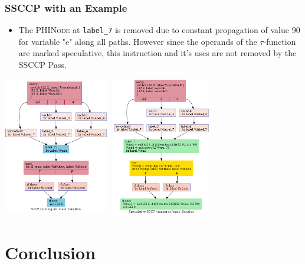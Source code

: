 \documentclass{beamer}
\begin{document}
\begin{frame}
	\frametitle{SSCCP with an Example}
	\footnotesize
	\begin{itemize}
\item The \textsc{PHINode} at \texttt{label\_7} is removed due to constant propagation of value 90 for variable "e" along all paths. However since the operands of the $\tau$-function are marked speculative, this instruction and it's uses are not removed by the SSCCP Pass.
	\end{itemize}
	\centering
	\includegraphics[width=4.6cm,height=6.1cm]{SCCP_BASELINE.dot.png}
	\includegraphics[width=4.6cm,height=6.1cm]{specSCCP_HPSSA.dot.png}
\end{frame}

\section{Conclusion}
\end{document}
